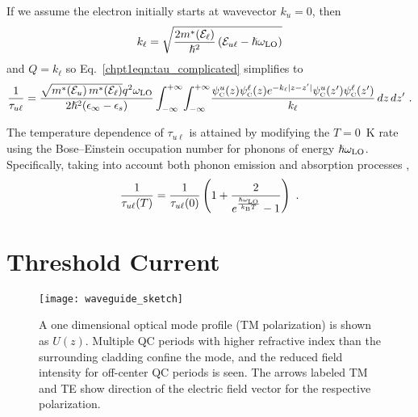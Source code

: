 \documentclass[12pt]{report}
\begin{document}
If we assume the electron initially starts at wavevector $k_u=0$, then
\begin{equation}
k_\ell = \sqrt{\frac{2 m^*\!\left(\EE_\ell\right)}{\hslash^2} \left(\EE_{u\ell}-\hslash\omega_{\tn{LO}}\right)}
\end{equation}
and $Q=k_\ell$ so Eq.~\eqref{chpt1eqn:tau_complicated} simplifies to
\begin{equation}
\frac{1}{\tau_{u\ell}} = \frac{\sqrt{m^*\!\left(\EE_u\right) m^*\!\left(\EE_\ell\right)} q^2 \omega_{\tn{LO}}}{2 \hslash^2 (\epsilon_\infty - \epsilon_s)} \int_{-\infty}^{+\infty} \! \int_{-\infty}^{+\infty} \!  \frac{\psi_\tn{\tiny{C}}^u(z) \psi_\tn{\tiny{C}}^\ell (z) e^{-k_\ell|z-z'|} \psi_\tn{\tiny{C}}^u(z') \psi_\tn{\tiny{C}}^\ell (z')}{k_\ell}  \, dz \, dz' \tn{~.}
\end{equation}

The temperature dependence of $\tau_{u\ell}$ is attained by modifying the $T=0$~K rate using the Bose--Einstein occupation number for phonons of energy $\hslash\omega_{\textnormal{LO}}$.  Specifically, taking into account both phonon emission and absorption processes \cite{Ferreira:PRB:1989},
\begin{equation}
\frac{1}{\tau_{u\ell}(T)} = \frac{1}{\tau_{u\ell}(0)}  \left(1 + \frac{2}{e^{\frac{\hslash\omega_{\textnormal{LO}}}{k_{\textnormal{B}} T}}-1} \right) \textnormal{~.}
\end{equation}




%
%


\section{Threshold Current}

\begin{figure}[tp]
\centering
\texttt{[image: waveguide\_sketch]}
\caption[Sketch of waveguide geometry]{ A one dimensional optical mode profile (TM polarization) is shown as $U(z)$.  Multiple QC periods with higher refractive index than the surrounding cladding confine the mode, and the reduced field intensity for off-center QC periods is seen.  The arrows labeled TM and TE show direction of the electric field vector for the respective polarization.}
\label{chpt1:wg_sketch}
\end{figure}
\end{document}
